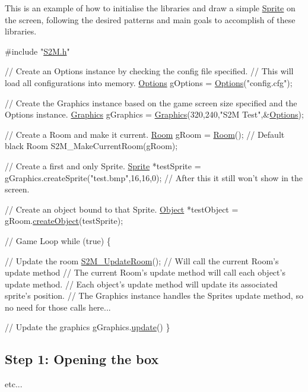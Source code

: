 This is an example of how to initialise the libraries and draw a simple \hyperlink{class_sprite}{Sprite} on the screen, following the desired patterns and main goals to accomplish of these libraries. 
\begin{DoxyCode}
\textcolor{preprocessor}{#include "\hyperlink{_s2_m_8h}{S2M.h}"}

\textcolor{comment}{// Create an Options instance by checking the config file specified.}
\textcolor{comment}{// This will load all configurations into memory.}
\hyperlink{class_options}{Options} gOptions = \hyperlink{class_options}{Options}(\textcolor{stringliteral}{"config.cfg"});

\textcolor{comment}{// Create the Graphics instance based on the game screen size specified and the Options instance.}
\hyperlink{class_graphics}{Graphics} gGraphics = \hyperlink{class_graphics}{Graphics}(320,240,\textcolor{stringliteral}{"S2M Test"},&\hyperlink{class_options}{Options});

\textcolor{comment}{// Create a Room and make it current.}
\hyperlink{class_room}{Room} gRoom = \hyperlink{class_room}{Room}(); \textcolor{comment}{// Default black Room}
S2M\_MakeCurrentRoom(gRoom);

\textcolor{comment}{// Create a first and only Sprite.}
\hyperlink{class_sprite}{Sprite} *testSprite = gGraphics.createSprite(\textcolor{stringliteral}{"test.bmp"},16,16,0); \textcolor{comment}{// After this it still won't show in
       the screen.}

\textcolor{comment}{// Create an object bound to that Sprite.}
\hyperlink{class_object}{Object} *testObject = gRoom.\hyperlink{class_room_a0c09098560d165c23287969c77c702cc}{createObject}(testSprite);

\textcolor{comment}{// Game Loop}
\textcolor{keywordflow}{while} (\textcolor{keyword}{true}) \{

    \textcolor{comment}{// Update the room}
    \hyperlink{room_8cpp_a7e17b634091c660ba4b52f5a0940d7e4}{S2M\_UpdateRoom}();   \textcolor{comment}{// Will call the current Room's update method}
                        \textcolor{comment}{// The current Room's update method will call each object's update method.}
                        \textcolor{comment}{// Each object's update method will update its associated sprite's position.}
                        \textcolor{comment}{// The Graphics instance handles the Sprites update method, so no need for those
       calls here...}

    \textcolor{comment}{// Update the graphics}
    gGraphics.\hyperlink{class_graphics_a5a5297a160c22f73300dcf72ac0be7c2}{update}()
\}
\end{DoxyCode}
\hypertarget{index_step1}{}\subsection{Step 1\-: Opening the box}\label{index_step1}
etc... 